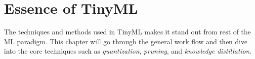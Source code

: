 \documentclass[../main]{subfiles}
\begin{document}
\chapter{Essence of TinyML} \label{chp:}

The techniques and methods used in TinyML makes it stand out from
rest of the ML paradigm. This chapter will go through the general
work flow and then dive into the core techniques such as \emph{quantization},
\emph{pruning}, and \emph{knowledge distillation}.






\end{document}

